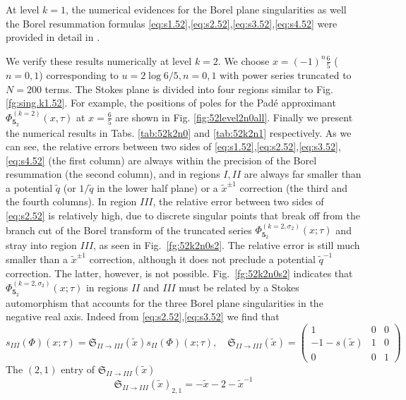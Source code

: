\documentclass[a4paper,11pt]{article}	%
\def\md{\mathbf}
\def\mf{\mathfrak}
\def\tq{\tilde{q}}
\def\tx{\tilde{x}}
\newcommand{\s}{\sigma}
\newcommand{\knot}[1]{\md{#1}}
\def\jjj#1{$\spadesuit\spadesuit$ \emph{\textcolor{red}{#1}}
  $\spadesuit\spadesuit$}
\begin{document}
At level $k=1$, the numerical evidences for the Borel plane
singularities as well the Borel resummation formulas
\eqref{eq:s1.52},\eqref{eq:s2.52},\eqref{eq:s3.52},\eqref{eq:s4.52}
were provided in detail in \cite{Garoufalidis:2020xec}.


We verify these results numerically at level $k=2$.  We choose
$x =(-1)^n \frac{6}{5} $ ($n=0,1$) corresponding to
$u=2\log 6/5, n=0,1$ with power series truncated to $N=200$ terms.
The Stokes plane is divided into four regions similar to
Fig. \ref{fg:sing.k1.52}. For example, the positions of poles for the
Pad\'{e} approximant $\Phi_{\knot{5}_2}^{(k=2)}(x,\tau)$ at
$x = \frac{6}{5}$ are shown in Fig. \ref{fig:52level2n0all}.
Finally we present the numerical results in Tabs. \ref{tab:52k2n0} and
\ref{tab:52k2n1} respectively.
%
As we can see, the relative errors between two sides of
\eqref{eq:s1.52},\eqref{eq:s2.52},\eqref{eq:s3.52},\eqref{eq:s4.52}
(the first column) are always within the precision of the Borel
resummation (the second column), and in regions $I, II$ are always far
smaller than a potential $\tq$ (or $1/\tq$ in the lower half plane) or
a $\tx^{\pm 1}$ correction (the third and the fourth columns).  In
region $III$, the relative error between two sides of \eqref{eq:s2.52}
is relatively high, due to discrete singular points that break off
from the branch cut of the Borel transform of the truncated series
$\Phi_{\knot{5}_2}^{(k=2,\s_2)}(x;\tau)$ and stray into region $III$,
as seen in Fig.~\ref{fg:52k2n0s2}.  The relative error is still much
smaller than a $\tx^{\pm 1}$ correction, although it does not preclude
a potential $\tq^{- 1}$ correction. The latter, however, is not
possible.  Fig.~\ref{fg:52k2n0s2} indicates that
$\Phi_{\knot{5}_2}^{(k=2,\s_2)}(x;\tau)$ in regions $II$ and $III$
must be related by a Stokes automorphism that accounts for the three
Borel plane singularities in the negative real axis.  Indeed from
\eqref{eq:s2.52},\eqref{eq:s3.52} we find that
\begin{equation}
  s_{III}(\Phi)(x;\tau) = \mf{S}_{II\rightarrow III}(\tx)s_{II}(\Phi)(x;\tau),
  \quad \mf{S}_{II\rightarrow III}(\tx) =
  \begin{pmatrix}
    1&0&0\\
    -1-s(\tx)&1&0\\
    0&0&1
  \end{pmatrix}
\end{equation}
The $(2,1)$ entry of $\mf{S}_{II\rightarrow III}(\tx)$
\begin{equation}
  \mf{S}_{II\rightarrow III}(\tx)_{2,1} = -\tx-2-\tx^{-1}
\end{equation}
\end{document}
